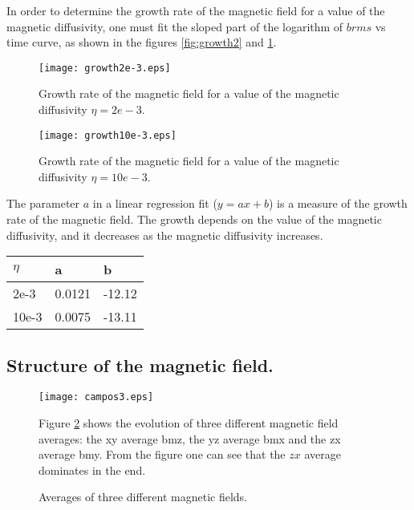 In order to determine the growth rate of the magnetic field for a value of the magnetic diffusivity, one must fit the sloped part of the logarithm of $brms$ vs time curve, as shown in the figures \ref{fig:growth2} and \ref{fig:growth10}.

\begin{figure}[h]
\begin{minipage}{.45\textwidth}
\centering
\texttt{[image: growth2e-3.eps]}
\caption{Growth rate of the magnetic field for a value of the magnetic diffusivity  $\eta = 2e-3$.}
\label{fig:growth2}
\end{minipage}
\hspace{0.5cm}
\begin{minipage}{.45\textwidth}
\centering
 \texttt{[image: growth10e-3.eps]}
\caption{Growth rate of the magnetic field for a value of the magnetic diffusivity  $\eta = 10e-3$.}
\label{fig:growth10}
\end{minipage}
 \end{figure}
The parameter $a$ in a linear regression fit ($y=ax+b$) is a measure of the growth rate of the magnetic field. The growth depends on the value of the magnetic diffusivity, and it decreases as the magnetic diffusivity increases.
\begin{center}
\begin{tabular}{lll}
$\eta$ & a & b\\\hline
2e-3 & 0.0121 & -12.12\\
10e-3 & 0.0075 & -13.11
\end{tabular}
\end{center}

\subsection{Structure of the magnetic field.}

\begin{figure}[h]
\begin{minipage}{.45\textwidth}

\centering
\texttt{[image: campos3.eps]}
\caption{Averages of three different magnetic fields.}
\label{fig:averages}

\end{minipage}
\hspace{0.5cm}
\begin{minipage}{.45\textwidth}
Figure \ref{fig:averages} shows the evolution of three different magnetic field averages: the xy average bmz, the yz average bmx and the zx average bmy. 
From the figure one can see that the $zx$ average dominates in the end.
\end{minipage}
 \end{figure}

